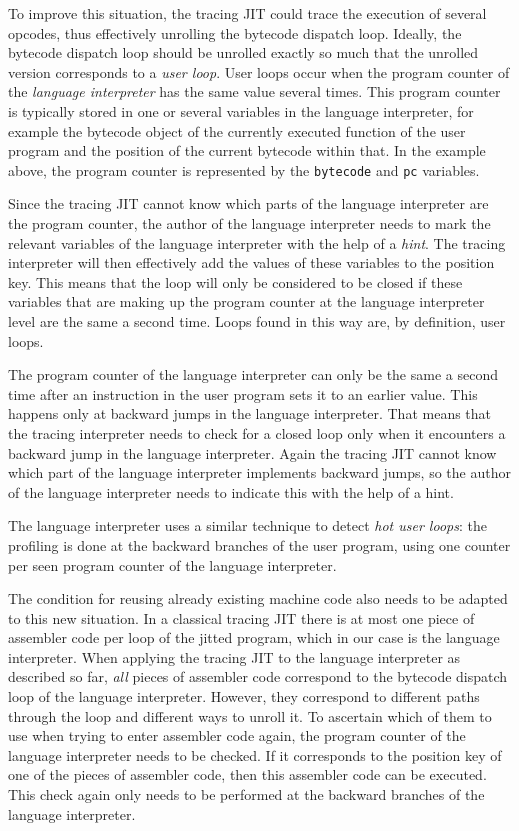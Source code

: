 \documentclass{sig-alternate}
\begin{document}
To improve this situation, the tracing JIT could trace the execution of several
opcodes, thus effectively unrolling the bytecode dispatch loop. Ideally, the
bytecode dispatch loop should be unrolled exactly so much that the unrolled version
corresponds to a \emph{user loop}. User loops
occur when the program counter of the \emph{language interpreter} has the
same value several times. This program counter is typically stored in one or several
variables in the language interpreter, for example the bytecode object of the
currently executed function of the user program and the position of the current
bytecode within that.  In the example above, the program counter is represented by 
the \texttt{bytecode} and \texttt{pc} variables.

Since the tracing JIT cannot know which parts of the language interpreter are
the program counter, the author of the language interpreter needs to mark the
relevant variables of the language interpreter with the help of a \emph{hint}.
The tracing interpreter will then effectively add the values of these variables
to the position key. This means that the loop will only be considered to be
closed if these variables that are making up the program counter at the language
interpreter level are the same a second time.  Loops found in this way are, by
definition, user loops.

The program counter of the language interpreter can only be the same a
second time after an instruction in the user program sets it to an earlier
value. This happens only at backward jumps in the language interpreter. That
means that the tracing interpreter needs to check for a closed loop only when it
encounters a backward jump in the language interpreter. Again the tracing JIT
cannot know which part of the language interpreter implements backward jumps,
so the author of the language interpreter needs to indicate this with the help
of a hint.

The language interpreter uses a similar technique to detect \emph{hot user
loops}: the profiling is done at the backward branches of the user program,
using one counter per seen program counter of the language interpreter.

The condition for reusing already existing machine code also needs to be adapted to
this new situation. In a classical tracing JIT there is at most one piece of
assembler code per loop of the jitted program, which in our case is the language
interpreter. When applying the tracing JIT to the language interpreter as
described so far, \emph{all} pieces of assembler code correspond to the bytecode
dispatch loop of the language interpreter. However, they correspond to different
paths through the loop and different ways to unroll it. To ascertain which of them to use
when trying to enter assembler code again, the program counter of the language
interpreter needs to be checked. If it corresponds to the position key of one of
the pieces of assembler code, then this assembler code can be executed. This
check again only needs to be performed at the backward branches of the language
interpreter.
\end{document}
